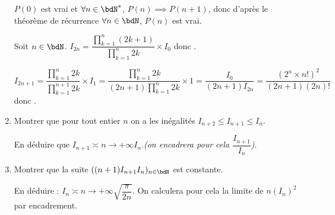 \documentclass[a4paper,french,bookmarks]{article}
\begin{document}
\begin{enumerate}
{        $P(0)$ est vrai et  $\forall n \in \bdN^*$, $P(n) \implies P(n+1)$, donc d'après le théorème de récurrence  $\forall n \in \bdN$, $P(n)$ est vrai.
        
        Soit $n \in \bdN$. $I_{2n} = \dfrac{\displaystyle \prod_{k=1}^n (2k+1)}{\displaystyle \prod_{k=1}^n 2k}\times I_0$ donc . 
        
        $I_{2n+1} = \dfrac{\displaystyle \prod_{k=1}^n 2k}{\displaystyle \prod_{k=1}^{n+1} 2k}\times I_1 = \dfrac{\displaystyle \prod_{k=1}^n 2k}{\displaystyle (2n+1)\prod_{k=1}^{n} 2k} \times 1 = \dfrac{I_0}{(2n+1)I_{2n}} = \dfrac{\left(2^n\times n!\right)^2}{\left(2n+1\right)(2n)!}$ donc .
    }
    \item Montrer que pour tout entier $n$ on a les inégalités $I_{n+2} \leq I_{n+1} \leq I_n$.
    
    En déduire que $I_{n+1} \asymp{n \to +\infty} I_n$.\qquad \textit{(on encadrera pour cela $\dfrac{I_{n+1}}{I_n}$)}.
    

    \item Montrer que la suite $((n+1)I_{n+1}I_n)_{n \in \bdN}$ est constante.
    
    En déduire : \quad $I_n \asymp{n \to +\infty} \sqrt{\dfrac{\pi}{2n}}$. \quad On calculera pour cela la limite de $n(I_n)^2$ par encadrement.
        

\end{enumerate}
\end{document}
